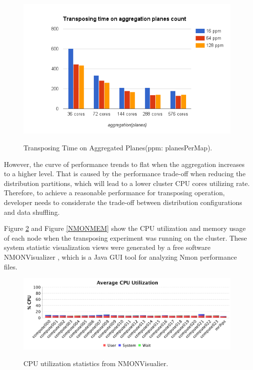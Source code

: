 \begin{figure}[h]
\centering
\includegraphics[scale=0.7]{figures/PerfTestAgg.png}\\
\caption{Transposing Time on Aggregated Planes(ppm: planesPerMap).}\label{PerfTestAgg}
\end{figure}

However, the curve of performance trends to flat when the aggregation increases to a higher level. That is caused by the performance trade-off when reducing the distribution partitions, which will lead to a lower cluster CPU cores utilizing rate. Therefore, to achieve a reasonable performance for transposing operation, developer needs to considerate the trade-off between distribution configurations and data shuffling. 

Figure \ref{NMONCPU} and Figure \ref{NMONMEM} show the CPU utilization and memory usage of each node when the transposing experiment was running on the cluster. These system statistic visualization views were generated by a free software NMONVisualizer \cite{NMONVisualizer}, which is a Java GUI tool for analyzing Nmon performance files.

\begin{figure}[h]
\centering
\includegraphics[scale=0.6]{figures/NMONCpu.png}\\
\caption{CPU utilization statistics from NMONVisualier.}\label{NMONCPU}
\end{figure}

